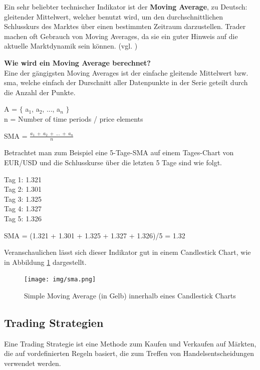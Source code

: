 \documentclass[oneside]{ausarbeitung}
\begin{document}
Ein sehr beliebter technischer Indikator ist der \textbf{Moving Average}, zu Deutsch: gleitender Mittelwert, welcher benutzt wird, um den durchschnittlichen Schlusskurs des Marktes über einen bestimmten Zeitraum darzustellen. Trader machen oft Gebrauch von Moving Averages, da sie ein guter Hinweis auf die aktuelle Marktdynamik sein können. (vgl. \cite{moving_average})

\textbf{Wie wird ein Moving Average berechnet?} \\
Eine der gängigsten Moving Averages ist der einfache gleitende Mittelwert bzw. \ac{sma}, welche einfach der Durschnitt aller Datenpunkte in der Serie geteilt durch die Anzahl der Punkte\cite{moving_average}.

A = $ \{ $ {a$_{1}$, a$_{2}$, ..., a$_{n}$} $ \} $ \\
n = Number of time periods / price elements

SMA = $\frac{a_1 \ + \ a_2 \ + \ ... \ + \ a_n}{n}$

Betrachtet man zum Beispiel eine 5-Tage-SMA auf einem Tages-Chart von EUR/USD und die Schlusskurse über die letzten 5 Tage sind wie folgt.

Tag 1: 1.321 \\
Tag 2: 1.301 \\
Tag 3: 1.325 \\
Tag 4: 1.327 \\
Tag 5: 1.326

SMA = (1.321 + 1.301 + 1.325 + 1.327 + 1.326)/5 = 1.32

Veranschaulichen lässt sich dieser Indikator gut in einem Candlestick Chart, wie in Abbildung \ref{fig:3} dargestellt.

\begin{figure}[H]
  \centering
  \texttt{[image: img/sma.png]}
  \caption{Simple Moving Average (in Gelb) innerhalb eines Candlestick Charts}
  \label{fig:3}
\end{figure} 

\subsection{Trading Strategien}
\label{sub:trading_strategien}

Eine Trading Strategie ist eine Methode zum Kaufen und Verkaufen auf Märkten, die auf vordefinierten Regeln basiert, die zum Treffen von Handelsentscheidungen verwendet werden\cite{trading_strategy}.
\end{document}
